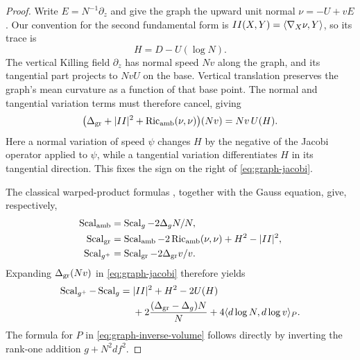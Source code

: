 \begin{proof}
Write $E=N^{-1}\partial_z$ and give the graph the upward unit normal
$\nu=-U+vE$. Our convention for the second fundamental form is
$II(X,Y)=\langle\nabla_X\nu,Y\rangle$, so its trace is
\begin{equation}\label{eq:graph-mean-curvature}
 H=D-U(\log N).
\end{equation}
The vertical Killing field $\partial_z$ has normal speed $Nv$ along the
graph, and its tangential part projects to $NvU$ on the base. Vertical
translation preserves the graph's mean curvature as a function of that
base point. The normal and tangential variation terms must therefore
cancel, giving
\begin{equation}\label{eq:graph-jacobi}
 \bigl(\Delta_{\rm gr}+\lvert II\rvert^2+\operatorname{Ric}_{\rm amb}(\nu,\nu)\bigr)(Nv)
       =Nv\,U(H).
\end{equation}
Here a normal variation of speed $\psi$ changes $H$ by the negative of the
Jacobi operator applied to $\psi$, while a tangential variation
differentiates $H$ in its tangential direction. This fixes the sign on the
right of \eqref{eq:graph-jacobi}.

The classical warped-product formulas \cite[Section~7]{BishopONeill1969},
together with the Gauss equation, give, respectively,
\[
 \begin{aligned}
 \operatorname{Scal}_{\rm amb}&=\operatorname{Scal}_g-2\Delta_gN/N,\\
 \operatorname{Scal}_{\rm gr}&=\operatorname{Scal}_{\rm amb}-2\operatorname{Ric}_{\rm amb}(\nu,\nu)
                         +H^2-\lvert II\rvert^2,\\
 \operatorname{Scal}_{g^+}&=\operatorname{Scal}_{\rm gr}-2\Delta_{\rm gr}v/v.
 \end{aligned}
\]
Expanding $\Delta_{\rm gr}(Nv)$ in \eqref{eq:graph-jacobi} therefore yields
\begin{equation}\label{eq:scalar-before-cancellation}
 \begin{split}
 \operatorname{Scal}_{g^+}-\operatorname{Scal}_g
 ={}&\lvert II\rvert^2+H^2-2U(H)\\
 &+2\frac{(\Delta_{\rm gr}-\Delta_g)N}{N}
   +4\langle d\log N,d\log v\rangle_{P}.
 \end{split}
\end{equation}
The formula for $P$ in \eqref{eq:graph-inverse-volume} follows directly by inverting the rank-one addition $g+N^2df^2$.


\end{proof}
